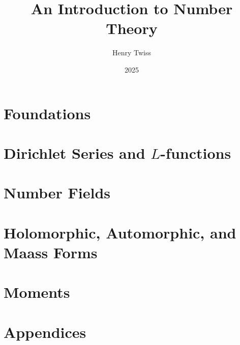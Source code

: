 \documentclass[12pt,oneside]{book}
\title{An Introduction to Number Theory}
\author{Henry Twiss}
\date{2025}
\begin{document}
\maketitle
\pagestyle{empty}
\tableofcontents
\setcounter{page}{0}
\pagestyle{fancy}

\part{Foundations}
  

\part{Dirichlet Series and \texorpdfstring{$L$}{L}-functions}
  
  
  

\part{Number Fields}
  
  
  
  

\part{Holomorphic, Automorphic, and Maass Forms}
  
  
  
  
  

\part{Moments}
  
  

\part{Appendices}
  

\printindex


\end{document}
